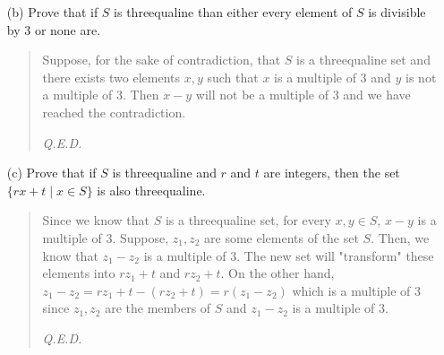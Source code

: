 \documentclass[12pt, a4paper]{article}                      %
\begin{document}
\begin{itemize}
\begin{itemize}
\item[(b)]
Prove that if $S$ is threequaline than either every element of $S$ is divisible by 3 or none are.
\begin{quote}
Suppose, for the sake of contradiction, that $S$ is a threequaline set and there exists two elements $x, y$ such that $x$ is a multiple of 3 and $y$ is not a multiple of 3. Then $x - y$ will not be a multiple of 3 and we have reached the contradiction.
\begin{flushright}
\textit{Q.E.D.}
\end{flushright}
\end{quote}

\item[]

\item[(c)]
Prove that if $S$ is threequaline and $r$ and $t$ are integers, then the set $\{rx + t \mid x \in S\}$ is also threequaline.
\begin{quote}
Since we know that $S$ is a threequaline set, for every $x, y \in S$, $x - y$ is a multiple of 3. Suppose, $z_1, z_2$ are some elements of the set $S$. Then, we know that $z_1 - z_2$ is a multiple of 3. The new set will "transform" these elements into $rz_1 + t$ and $rz_2 + t$. On the other hand, $z_1 - z_2 = rz_1 + t - (rz_2 + t) = r(z_1 - z_2)$ which is a multiple of 3 since $z_1, z_2$ are the members of $S$ and $z_1 - z_2$ is a multiple of 3.
\begin{flushright}
\textit{Q.E.D.}
\end{flushright}
\end{quote}

\item[]


\end{itemize}
\end{itemize}
\end{document}
